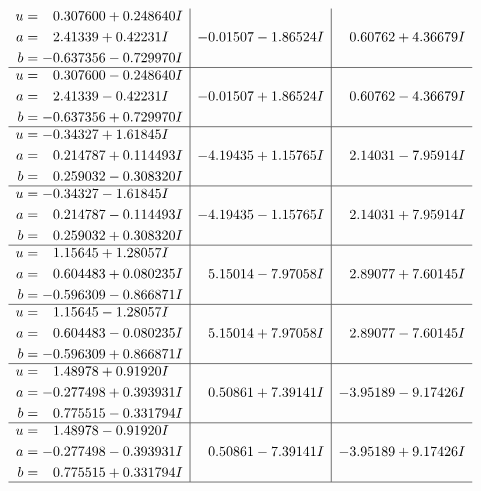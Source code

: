 \documentclass[1p]{elsarticle_modified}
\theoremstyle{definition}
\begin{document}
$$\begin{array}{c|c|c}
\begin{aligned}
u &= \phantom{-}0.307600 + 0.248640 I \\
a &= \phantom{-}2.41339 + 0.42231 I \\
b &= -0.637356 - 0.729970 I\end{aligned}
 & -0.01507 - 1.86524 I & \phantom{-}0.60762 + 4.36679 I \\ \hline\begin{aligned}
u &= \phantom{-}0.307600 - 0.248640 I \\
a &= \phantom{-}2.41339 - 0.42231 I \\
b &= -0.637356 + 0.729970 I\end{aligned}
 & -0.01507 + 1.86524 I & \phantom{-}0.60762 - 4.36679 I \\ \hline\begin{aligned}
u &= -0.34327 + 1.61845 I \\
a &= \phantom{-}0.214787 + 0.114493 I \\
b &= \phantom{-}0.259032 - 0.308320 I\end{aligned}
 & -4.19435 + 1.15765 I & \phantom{-}2.14031 - 7.95914 I \\ \hline\begin{aligned}
u &= -0.34327 - 1.61845 I \\
a &= \phantom{-}0.214787 - 0.114493 I \\
b &= \phantom{-}0.259032 + 0.308320 I\end{aligned}
 & -4.19435 - 1.15765 I & \phantom{-}2.14031 + 7.95914 I \\ \hline\begin{aligned}
u &= \phantom{-}1.15645 + 1.28057 I \\
a &= \phantom{-}0.604483 + 0.080235 I \\
b &= -0.596309 - 0.866871 I\end{aligned}
 & \phantom{-}5.15014 - 7.97058 I & \phantom{-}2.89077 + 7.60145 I \\ \hline\begin{aligned}
u &= \phantom{-}1.15645 - 1.28057 I \\
a &= \phantom{-}0.604483 - 0.080235 I \\
b &= -0.596309 + 0.866871 I\end{aligned}
 & \phantom{-}5.15014 + 7.97058 I & \phantom{-}2.89077 - 7.60145 I \\ \hline\begin{aligned}
u &= \phantom{-}1.48978 + 0.91920 I \\
a &= -0.277498 + 0.393931 I \\
b &= \phantom{-}0.775515 - 0.331794 I\end{aligned}
 & \phantom{-}0.50861 + 7.39141 I & -3.95189 - 9.17426 I \\ \hline\begin{aligned}
u &= \phantom{-}1.48978 - 0.91920 I \\
a &= -0.277498 - 0.393931 I \\
b &= \phantom{-}0.775515 + 0.331794 I\end{aligned}
 & \phantom{-}0.50861 - 7.39141 I & -3.95189 + 9.17426 I\\
 \hline 
 \end{array}$$\newpage\newpage\renewcommand{\arraystretch}{1}
\end{document}
